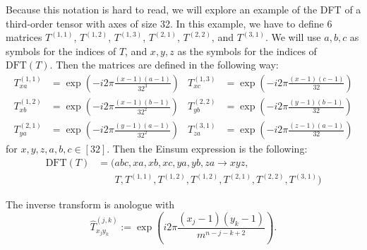 Because this notation is hard to read, we will explore an example of the DFT of a third-order tensor with axes of size 32.
In this example, we have to define 6 matrices $T^{(1,1)}$, $T^{(1,2)}$, $T^{(1,3)}$, $T^{(2,1)}$, $T^{(2, 2)}$, and $T^{(3,1)}$.
We will use $a,b,c$ as symbols for the indices of $T$, and $x,y,z$ as the symbols for the indices of $\text{DFT}(T)$.
Then the matrices are defined in the following way:
\begin{align*}
    T^{(1,1)}_{xa} & = \exp\left(-i2\pi \frac{(x - 1)(a - 1)}{32^3}\right) & T^{(1,3)}_{xc} & = \exp\left(-i2\pi \frac{(x - 1)(c - 1)}{32}\right) \\
    T^{(1,2)}_{xb} & = \exp\left(-i2\pi \frac{(x - 1)(b - 1)}{32^2}\right) & T^{(2,2)}_{yb} & = \exp\left(-i2\pi \frac{(y - 1)(b - 1)}{32}\right) \\
    T^{(2,1)}_{ya} & = \exp\left(-i2\pi \frac{(y - 1)(a - 1)}{32^2}\right) & T^{(3,1)}_{za} & = \exp\left(-i2\pi \frac{(z - 1)(a - 1)}{32}\right)
\end{align*}
for $x, y, z, a, b, c \in [32]$.
Then the Einsum expression is the following:
\begin{align*}
    \text{DFT}(T) & = (abc, xa, xb, xc, ya, yb, za \rightarrow xyz,                                     \\
                  & \phantom{{}=(} T, T^{(1,1)}, T^{(1,2)}, T^{(1,2)}, T^{(2,1)}, T^{(2,2)}, T^{(3,1)})
\end{align*}

The inverse transform is anologue with
$$\hat{T}^{(j,k)}_{x_j y_k} := \exp\left(i2\pi \frac{(x_j - 1) (y_k - 1)}{m^{n - j - k + 2}}\right).$$